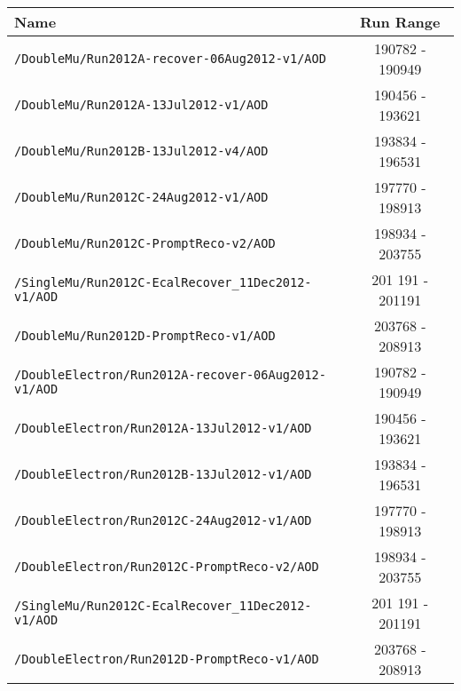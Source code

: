 \begin{table}[hbt]
\begin{center}
\begin{tabular}{lc}\hline\hline
Name		& Run Range  \\ \hline
\verb=/DoubleMu/Run2012A-recover-06Aug2012-v1/AOD=                 & 190782 - 190949 \\ 
\verb=/DoubleMu/Run2012A-13Jul2012-v1/AOD=                                  &  190456 - 193621                     \\ 
\verb=/DoubleMu/Run2012B-13Jul2012-v4/AOD=                                  &  193834 - 196531                     \\ 
\verb=/DoubleMu/Run2012C-24Aug2012-v1/AOD=                                &  197770 - 198913  \\  
\verb=/DoubleMu/Run2012C-PromptReco-v2/AOD=                               &  198934 - 203755                     \\ 
\verb=/SingleMu/Run2012C-EcalRecover_11Dec2012-v1/AOD=          & 201 191 - 201191 \\
\verb=/DoubleMu/Run2012D-PromptReco-v1/AOD=                               &  203768 - 208913   \\

\verb=/DoubleElectron/Run2012A-recover-06Aug2012-v1/AOD=         &    190782 - 190949                   \\ 
\verb=/DoubleElectron/Run2012A-13Jul2012-v1/AOD=                         & 190456 - 193621                       \\ 
\verb=/DoubleElectron/Run2012B-13Jul2012-v1/AOD=                         &  193834 - 196531  \\ 
\verb=/DoubleElectron/Run2012C-24Aug2012-v1/AOD=                       &  197770 - 198913                    \\ 
\verb=/DoubleElectron/Run2012C-PromptReco-v2/AOD=                     &   198934 - 203755                  \\ 
\verb=/SingleMu/Run2012C-EcalRecover_11Dec2012-v1/AOD=          & 201 191 - 201191 \\
\verb=/DoubleElectron/Run2012D-PromptReco-v1/AOD=                      &  203768 - 208913   \\


\end{tabular}
\end{center}
\end{table}
